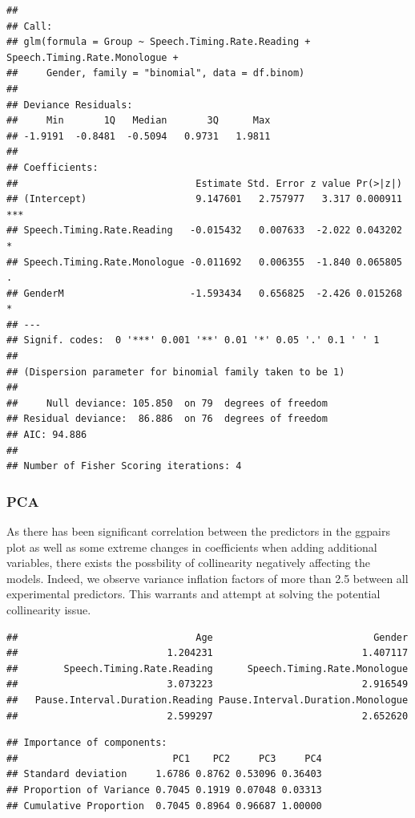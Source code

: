 \documentclass[
  english,
  doc,floatsintext]{apa6}
\begin{document}
\begin{verbatim}
## 
## Call:
## glm(formula = Group ~ Speech.Timing.Rate.Reading + Speech.Timing.Rate.Monologue + 
##     Gender, family = "binomial", data = df.binom)
## 
## Deviance Residuals: 
##     Min       1Q   Median       3Q      Max  
## -1.9191  -0.8481  -0.5094   0.9731   1.9811  
## 
## Coefficients:
##                               Estimate Std. Error z value Pr(>|z|)    
## (Intercept)                   9.147601   2.757977   3.317 0.000911 ***
## Speech.Timing.Rate.Reading   -0.015432   0.007633  -2.022 0.043202 *  
## Speech.Timing.Rate.Monologue -0.011692   0.006355  -1.840 0.065805 .  
## GenderM                      -1.593434   0.656825  -2.426 0.015268 *  
## ---
## Signif. codes:  0 '***' 0.001 '**' 0.01 '*' 0.05 '.' 0.1 ' ' 1
## 
## (Dispersion parameter for binomial family taken to be 1)
## 
##     Null deviance: 105.850  on 79  degrees of freedom
## Residual deviance:  86.886  on 76  degrees of freedom
## AIC: 94.886
## 
## Number of Fisher Scoring iterations: 4
\end{verbatim}

\hypertarget{pca}{%
\subsubsection{PCA}\label{pca}}

As there has been significant correlation between the predictors in the ggpairs plot
as well as some extreme changes in coefficients when adding additional variables,
there exists the possbility of collinearity negatively affecting the models. Indeed,
we observe variance inflation factors of more than 2.5 between all experimental predictors.
This warrants and attempt at solving the potential collinearity issue.

\begin{verbatim}
##                               Age                            Gender 
##                          1.204231                          1.407117 
##        Speech.Timing.Rate.Reading      Speech.Timing.Rate.Monologue 
##                          3.073223                          2.916549 
##   Pause.Interval.Duration.Reading Pause.Interval.Duration.Monologue 
##                          2.599297                          2.652620
\end{verbatim}

\begin{verbatim}
## Importance of components:
##                           PC1    PC2     PC3     PC4
## Standard deviation     1.6786 0.8762 0.53096 0.36403
## Proportion of Variance 0.7045 0.1919 0.07048 0.03313
## Cumulative Proportion  0.7045 0.8964 0.96687 1.00000
\end{verbatim}
\end{document}
